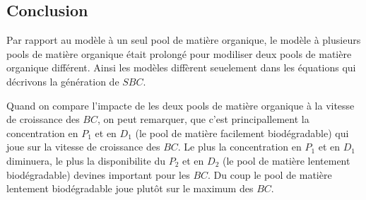 \FloatBarrier
\subsection{Conclusion}
\par{
Par rapport au mod\`ele \`a un seul pool de matière organique,
le mod\`ele \`a plusieurs pools de matière organique était prolongé pour modiliser deux pools de
matière organique différent. Ainsi les modèles diffèrent seuelement dans les équations qui
décrivons la génération de $SBC$.
}
\par{
Quand on compare l'impacte de les deux pools de matière organique à la vitesse de croissance des $BC$, on
peut remarquer, que c'est principallement la concentration en $P_1$ et en $D_1$ (le pool de matière facilement
biodégradable) qui joue sur la vitesse de croissance des $BC$. Le plus la concentration en $P_1$ et en $D_1$
diminuera, le plus la disponibilite du $P_2$ et en $D_2$ (le pool de matière lentement biodégradable) devines
important pour les $BC$. Du coup le pool de matière lentement biodégradable joue plutôt sur le maximum des
$BC$.
}
